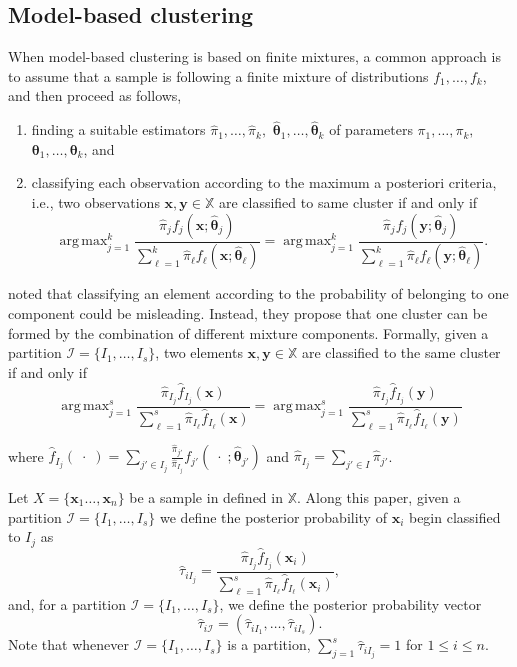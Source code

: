 \documentclass[10pt, a4paper]{article}
\DeclareMathOperator*{\argmax}{arg\,max}
\newcommand{\m}[1]{\boldsymbol{#1}}
\begin{document}
\subsection*{Model-based clustering}

When model-based clustering is based on finite mixtures, a common approach is to assume that a sample is following a finite mixture of distributions $f_1, \dots, f_k$, and then proceed as follows, 
\begin{enumerate}
\item finding a suitable estimators $\hat{\pi}_1, \dots, \hat{\pi}_k,$ $\hat{\m\theta}_1, \dots, \hat{\m\theta}_k$ of parameters $\pi_1, \dots, \pi_k,$ $\m\theta_1, \dots, \m\theta_k$, and
\item classifying each observation according to the maximum a posteriori criteria, i.e., two observations $\m x, \m y \in \mathbb{X}$ are classified to same cluster if and only if
\[
\argmax_{j=1}^k \frac{ \hat{\pi}_j f_j(\m x ; \hat{\m\theta}_j) }{\sum_{\ell=1}^k \hat{\pi}_\ell f_\ell(\m x ; \hat{\m\theta}_\ell) } = \argmax_{j=1}^k \frac{ \hat{\pi}_j f_j(\m y ; \hat{\m\theta}_j) }{ \sum_{\ell=1}^k \hat{\pi}_\ell f_\ell(\m y ; \hat{\m\theta}_\ell) }.
\]
\end{enumerate}


\cite{lee2004combining,hennig2010methods,baudry2010combining,melnykov2013distribution,pastore2013merging} noted that classifying an element according to the probability of belonging to one component could be misleading. Instead, they propose that one cluster can be formed by the combination of different mixture components. Formally, given a partition $\mathcal{I} = \{ I_1, \dots, I_s\}$, two elements $\m x, \m y \in \mathbb{X}$ are classified to the same cluster if and only if
\begin{equation}\label{cluster_criteria}
\argmax_{j=1}^s \frac{ \hat{\pi}_{I_j} \hat{f}_{I_j}(\m x) }{\sum_{\ell=1}^s \hat{\pi}_{I_\ell} \hat{f}_{I_\ell}(\m x ) } = \argmax_{j=1}^s \frac{ \hat{\pi}_{I_j} \hat{f}_{I_j}(\m y) }{ \sum_{\ell=1}^s \hat{\pi}_{I_\ell} \hat{f}_{I_\ell}(\m y) }
\end{equation}

where $\hat{f}_{I_j}(\; \cdot \;) = \sum_{j' \in I_j} \frac{\hat{\pi}_{j'}}{\hat{\pi}_{I_j}} f_{j'}(\; \cdot \; ; \hat{\m\theta}_{j'})$ and $\hat{\pi}_{I_j} =  \sum_{j' \in I} \hat{\pi}_{j'}$. 

Let $X = \{\m x_1\dots, \m x_n\}$ be a sample in defined in $\mathbb{X}$. Along this paper, given a partition $\mathcal{I} = \{ I_1, \dots, I_s \}$ we define the posterior probability  of $\m x_i$ begin classified to $I_j$ as
\[
\hat{\tau}_{i I_j} =  \frac{ \hat{\pi}_{I_j} \hat{f}_{I_j}(\m x_i) }{\sum_{\ell=1}^s \hat{\pi}_{I_\ell} \hat{f}_{I_\ell}(\m x_i)},
\]
and, for a partition  $\mathcal{I} = \{ I_1, \dots, I_s\}$, we define the posterior probability vector
\[
\hat{\tau}_{i \mathcal{I}} = \left( \hat{\tau}_{i I_1} , \dots, \hat{\tau}_{i I_s}  \right).
\]
Note that whenever  $\mathcal{I} = \{ I_1, \dots, I_s\}$ is a partition, $\sum_{j=1}^s \hat{\tau}_{i I_j} = 1$ for $1 \leq i \leq n$.
\end{document}
